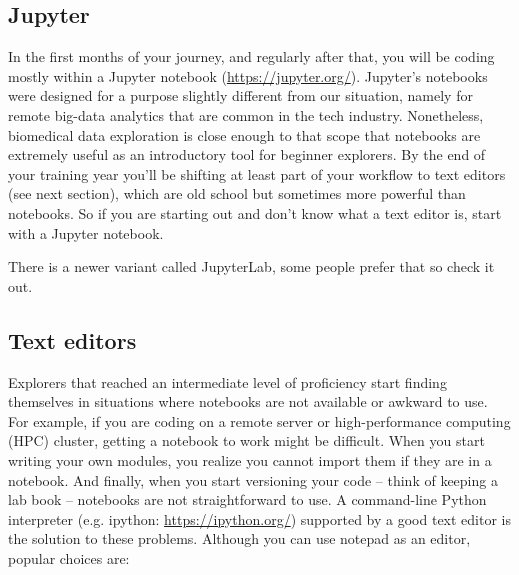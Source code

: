 \documentclass[12pt,a4paper,notitlepage,onecolumn]{article}
\begin{document}
\subsection{Jupyter}
In the first months of your journey, and regularly after that, you will be coding mostly within a Jupyter notebook (\url{https://jupyter.org/}). Jupyter's notebooks were designed for a purpose slightly different from our situation, namely for remote big-data analytics that are common in the tech industry. Nonetheless, biomedical data exploration is close enough to that scope that notebooks are extremely useful as an introductory tool for beginner explorers. By the end of your training year you'll be shifting at least part of your workflow to text editors (see next section), which are old school but sometimes more powerful than notebooks. So if you are starting out and don't know what a text editor is, start with a Jupyter notebook.

There is a newer variant called JupyterLab, some people prefer that so check it out.

\subsection{Text editors}
Explorers that reached an intermediate level of proficiency start finding themselves in situations where notebooks are not available or awkward to use. For example, if you are coding on a remote server or high-performance computing (HPC) cluster, getting a notebook to work might be difficult. When you start writing your own modules, you realize you cannot import them if they are in a notebook. And finally, when you start versioning your code -- think of keeping a lab book -- notebooks are not straightforward to use. A command-line Python interpreter (e.g. ipython: \url{https://ipython.org/}) supported by a good text editor is the solution to these problems. Although you can use notepad as an editor, popular choices are:
\end{document}
